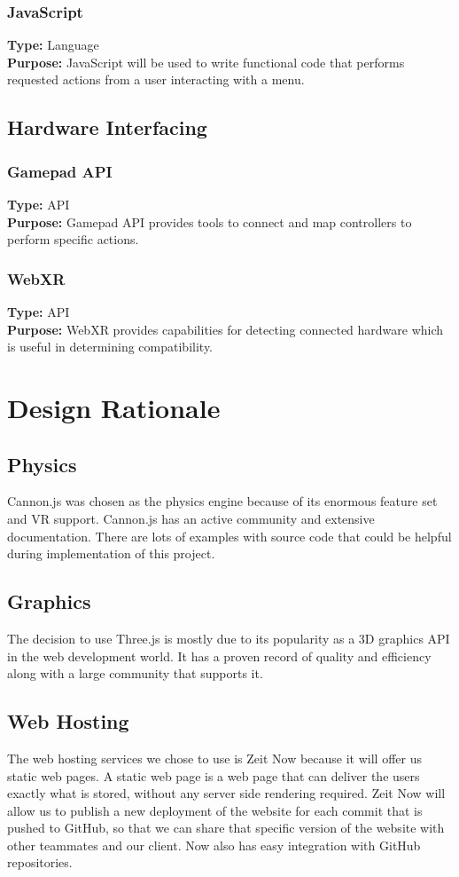 \documentclass[onecolumn, draftclsnofoot,10pt, compsoc]{IEEEtran}
\begin{document}
\subsubsection{JavaScript}
\textbf{Type:} Language\\
\textbf{Purpose:} JavaScript will be used to write functional code that performs requested actions from a user interacting with a menu.

\subsection{Hardware Interfacing}
\subsubsection{Gamepad API}
\textbf{Type:} API\\
\textbf{Purpose:} Gamepad API provides tools to connect and map controllers to perform specific actions.

\subsubsection{WebXR}
\textbf{Type:} API\\
\textbf{Purpose:}  WebXR provides capabilities for detecting connected hardware which is useful in determining compatibility.

\section{Design Rationale}

\subsection{Physics}
Cannon.js was chosen as the physics engine because of its enormous feature set and VR support. Cannon.js has an active community and extensive documentation. There are lots of examples with source code that could be helpful during implementation of this project.

\subsection{Graphics}
The decision to use Three.js is mostly due to its popularity as a 3D graphics API in the web development world. It has a proven record of quality and efficiency along with a large community that supports it.

\subsection{Web Hosting}
The web hosting services we chose to use is Zeit Now because it will offer us static web pages. A static web page is a web page that can deliver the users exactly what is stored, without any server side rendering required. Zeit Now will allow us to publish a new deployment of the website for each commit that is pushed to GitHub, so that we can share that specific version of the website with other teammates and our client. Now also has easy integration with GitHub repositories.
\end{document}
